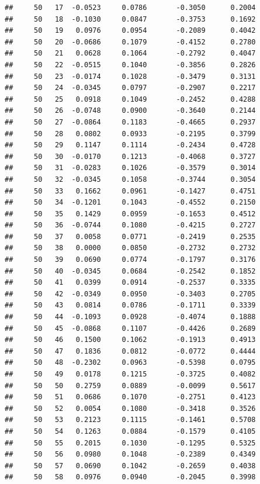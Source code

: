 \documentclass[
]{article}
\begin{document}
\begin{verbatim}
##     50   17  -0.0523     0.0786       -0.3050      0.2004  
##     50   18  -0.1030     0.0847       -0.3753      0.1692  
##     50   19   0.0976     0.0954       -0.2089      0.4042  
##     50   20  -0.0686     0.1079       -0.4152      0.2780  
##     50   21   0.0628     0.1064       -0.2792      0.4047  
##     50   22  -0.0515     0.1040       -0.3856      0.2826  
##     50   23  -0.0174     0.1028       -0.3479      0.3131  
##     50   24  -0.0345     0.0797       -0.2907      0.2217  
##     50   25   0.0918     0.1049       -0.2452      0.4288  
##     50   26  -0.0748     0.0900       -0.3640      0.2144  
##     50   27  -0.0864     0.1183       -0.4665      0.2937  
##     50   28   0.0802     0.0933       -0.2195      0.3799  
##     50   29   0.1147     0.1114       -0.2434      0.4728  
##     50   30  -0.0170     0.1213       -0.4068      0.3727  
##     50   31  -0.0283     0.1026       -0.3579      0.3014  
##     50   32  -0.0345     0.1058       -0.3744      0.3054  
##     50   33   0.1662     0.0961       -0.1427      0.4751  
##     50   34  -0.1201     0.1043       -0.4552      0.2150  
##     50   35   0.1429     0.0959       -0.1653      0.4512  
##     50   36  -0.0744     0.1080       -0.4215      0.2727  
##     50   37   0.0058     0.0771       -0.2419      0.2535  
##     50   38   0.0000     0.0850       -0.2732      0.2732  
##     50   39   0.0690     0.0774       -0.1797      0.3176  
##     50   40  -0.0345     0.0684       -0.2542      0.1852  
##     50   41   0.0399     0.0914       -0.2537      0.3335  
##     50   42  -0.0349     0.0950       -0.3403      0.2705  
##     50   43   0.0814     0.0786       -0.1711      0.3339  
##     50   44  -0.1093     0.0928       -0.4074      0.1888  
##     50   45  -0.0868     0.1107       -0.4426      0.2689  
##     50   46   0.1500     0.1062       -0.1913      0.4913  
##     50   47   0.1836     0.0812       -0.0772      0.4444  
##     50   48  -0.2302     0.0963       -0.5398      0.0795  
##     50   49   0.0178     0.1215       -0.3725      0.4082  
##     50   50   0.2759     0.0889       -0.0099      0.5617  
##     50   51   0.0686     0.1070       -0.2751      0.4123  
##     50   52   0.0054     0.1080       -0.3418      0.3526  
##     50   53   0.2123     0.1115       -0.1461      0.5708  
##     50   54   0.1263     0.0884       -0.1579      0.4105  
##     50   55   0.2015     0.1030       -0.1295      0.5325  
##     50   56   0.0980     0.1048       -0.2389      0.4349  
##     50   57   0.0690     0.1042       -0.2659      0.4038  
##     50   58   0.0976     0.0940       -0.2045      0.3998  

\end{verbatim}
\end{document}
